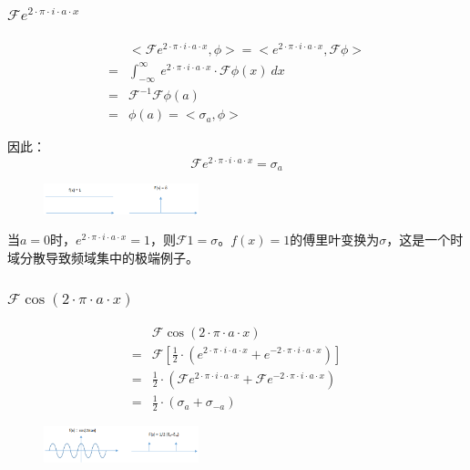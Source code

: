 \subsubsection{$\mathcal{F}e^{2\cdot \pi\cdot i\cdot a\cdot x}$}
\begin{align*}
	  & <\mathcal{F}e^{2\cdot \pi\cdot i\cdot a\cdot x},\phi>  =  <e^{2\cdot \pi\cdot i\cdot a\cdot x},\mathcal{F}\phi> \\
	= & \int_{-\infty}^{\infty}\ e^{2\cdot \pi\cdot i\cdot a\cdot x}\cdot \mathcal{F}\phi(x)\ dx                        \\
	= & \mathcal{F}^{-1}\mathcal{F}\phi(a)                                                                              \\
	= & \phi(a)= <\sigma_a,\phi>
\end{align*}

因此：
\begin{equation}
	\mathcal{F}e^{2\cdot \pi\cdot i\cdot a\cdot x}=\sigma_a
\end{equation}
\begin{figure}[H]
	\centering
	\includegraphics[width=0.4\textwidth]{assets/fe.png}
\end{figure}
当$a=0$时，$e^{2\cdot \pi\cdot i\cdot a\cdot x}=1$，则$\mathcal{F}1=\sigma$。$f(x)=1$的傅里叶变换为$\sigma$，这是一个时域分散导致频域集中的极端例子。
\subsubsection{$\mathcal{F}\cos(2\cdot\pi\cdot a\cdot x)$}
\begin{align*}
	  & \mathcal{F}\cos(2\cdot\pi\cdot a\cdot x)                                                                         \\
	= & \mathcal{F}[\frac{1}{2}\cdot(e^{2\cdot \pi\cdot i\cdot a\cdot x}+e^{-2\cdot \pi\cdot i\cdot a\cdot x})]          \\
	= & \frac{1}{2}\cdot(\mathcal{F}e^{2\cdot \pi\cdot i\cdot a\cdot x}+\mathcal{F}e^{-2\cdot \pi\cdot i\cdot a\cdot x}) \\
	= & \frac{1}{2}\cdot (\sigma_a+\sigma_{-a})
\end{align*}
\begin{figure}[H]
	\centering
	\includegraphics[width=0.4\textwidth]{assets/fcos.png}
\end{figure}

